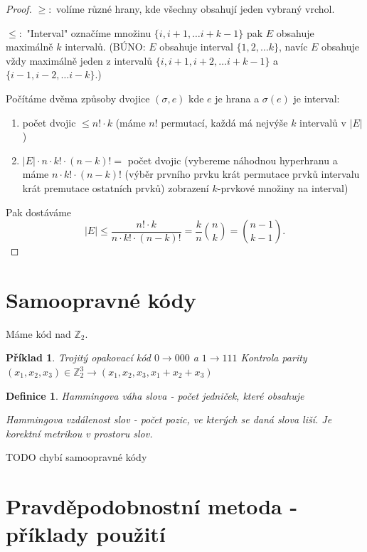 \documentclass[a4paper,10pt,titlepage]{article} \usepackage[utf8]{inputenc}
\newtheorem{define}{Definice}
\newtheorem*{example}{Příklad}
\begin{document}
\begin{proof}
$\geq :$ volíme různé hrany, kde všechny obsahují jeden vybraný vrchol.

$\leq :$ "Interval" označíme množinu $\{i,i+1,\ldots i+k-1\}$ pak $E$ obsahuje maximálně $k$ intervalů.
(BÚNO: $E$ obsahuje interval $\{1,2,\ldots k\}$, navíc $E$ obsahuje vždy maximálně jeden z intervalů 
$\{i,i+1,i+2,\ldots i+k-1\}$ a $\{i-1,i-2,\ldots i-k\}$.)

Počítáme dvěma způsoby dvojice $(\sigma,e)$ kde $e$ je hrana a $\sigma(e)$ je interval:
\begin{enumerate}
\item počet dvojic $\leq n! \cdot k$ (máme $n!$ permutací, každá má nejvýše $k$ intervalů v $|E|$)
\item $|E| \cdot n \cdot k! \cdot (n-k)! = $ počet dvojic
	(vybereme náhodnou hyperhranu a máme $n \cdot k! \cdot (n-k)!$ (výběr prvního prvku krát permutace prvků intervalu krát
	premutace ostatních prvků) zobrazení $k$-prvkové množiny na interval)
\end{enumerate}
Pak dostáváme 
\[
	|E| \leq \frac{n! \cdot k}{ n \cdot k! \cdot (n-k)!} = \frac{k}{n}\binom{n}{k} = \binom{n-1}{k-1}.
\]
\end{proof}

\medskip

\section{Samoopravné kódy}

Máme kód nad $\mathbb{Z}_2$.

\begin{example}
Trojitý opakovací kód $0 \rightarrow 000$ a $1 \rightarrow 111$
Kontrola parity $(x_1,x_2,x_3) \in \mathbb{Z}_2^3 \rightarrow (x_1,x_2,x_3,x_1+x_2+x_3)$
\end{example}

\begin{define}

Hammingova váha slova - počet jedniček, které obsahuje

Hammingova vzdálenost slov - počet pozic, ve kterých se daná slova liší. Je korektní metrikou v prostoru slov.
\end{define}

TODO chybí samoopravné kódy
\medskip

\section{Pravděpodobnostní metoda - příklady použití}
\end{document}
